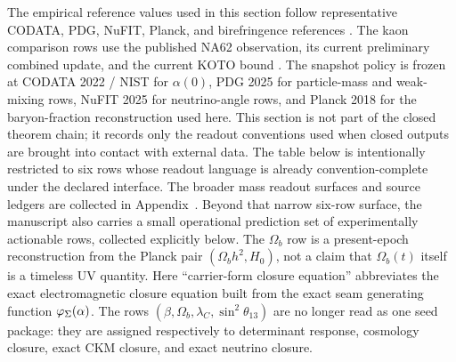 The empirical reference values used in this section follow representative CODATA, PDG, NuFIT, Planck,
and birefringence references
\cite{codata2022,pdg2025,nufit2025,planck2018,minamiKomatsu2020,eskilt2023,sullivan2025}. The
kaon comparison rows use the published NA62 observation, its current preliminary combined update,
and the current KOTO bound \cite{na62obs2025,na62Moriond2026,koto2024}. The
snapshot policy is frozen at CODATA 2022 / NIST for $\alpha(0)$, PDG 2025 for particle-mass and
weak-mixing rows, NuFIT 2025 for neutrino-angle rows, and Planck 2018 for the baryon-fraction
reconstruction used here. This section is not part of the closed theorem chain; it records only
the readout conventions used when closed outputs are brought into contact with external data.
The table below is intentionally restricted to six rows whose readout language is already
convention-complete under the declared interface. The broader mass readout surfaces and source
ledgers are collected in Appendix~. Beyond that narrow six-row surface, the
manuscript also carries a
small operational prediction set of experimentally actionable rows, collected explicitly below.
The $\Omega_b$ row is a present-epoch reconstruction from the Planck pair $(\Omega_b h^2,H_0)$,
not a claim that $\Omega_b(t)$ itself is a timeless UV quantity. Here \enquote{carrier-form
closure equation} abbreviates the exact electromagnetic closure equation built from the exact seam generating
function $\varphi_{\Sigma}(\alpha)$. The rows $(\beta,\Omega_b,\lambda_C,\sin^2\theta_{13})$ are no longer
read as one seed package: they are assigned respectively to determinant response, cosmology
closure, exact CKM closure, and exact neutrino closure.


